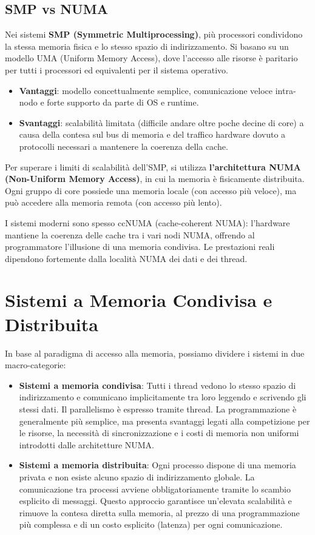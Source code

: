 \subsection{SMP vs NUMA}
Nei sistemi \textbf{SMP (Symmetric Multiprocessing)}, più processori condividono la stessa memoria fisica e lo stesso spazio di indirizzamento.
Si basano su un modello UMA (Uniform Memory Access), dove l'accesso alle risorse è paritario per tutti i processori ed equivalenti per il sistema operativo.
\begin{itemize}
    \item \textbf{Vantaggi}: modello concettualmente semplice, comunicazione veloce intra-nodo e forte supporto da parte di OS e runtime.
    \item \textbf{Svantaggi}: scalabilità limitata (difficile andare oltre poche decine di core) a causa della contesa sul bus di memoria e del traffico hardware dovuto a protocolli necessari a mantenere la coerenza della cache.
\end{itemize}
Per superare i limiti di scalabilità dell'SMP, si utilizza \textbf{l'architettura NUMA (Non-Uniform Memory Access)}, in cui la memoria è fisicamente distribuita.
Ogni gruppo di core possiede una memoria locale (con accesso più veloce), ma può accedere alla memoria remota (con accesso più lento).

I sistemi moderni sono spesso ccNUMA (cache-coherent NUMA): l'hardware mantiene la coerenza delle cache tra i vari nodi NUMA, offrendo al programmatore l'illusione di una memoria condivisa. Le prestazioni reali dipendono fortemente dalla località NUMA dei dati e dei thread.
\section{Sistemi a Memoria Condivisa e Distribuita}
In base al paradigma di accesso alla memoria, possiamo dividere i sistemi in due macro-categorie:
\begin{itemize}
    \item \textbf{Sistemi a memoria condivisa}: Tutti i thread vedono lo stesso spazio di indirizzamento e comunicano implicitamente tra loro leggendo e scrivendo gli stessi dati. Il parallelismo è espresso tramite thread. La programmazione è generalmente più semplice, ma presenta svantaggi legati alla competizione per le risorse, la necessità di sincronizzazione e i costi di memoria non uniformi introdotti dalle architetture NUMA.
    \item \textbf{Sistemi a memoria distribuita}: Ogni processo dispone di una memoria privata e non esiste alcuno spazio di indirizzamento globale. La comunicazione tra processi avviene obbligatoriamente tramite lo scambio esplicito di messaggi. Questo approccio garantisce un'elevata scalabilità e rimuove la contesa diretta sulla memoria, al prezzo di una programmazione più complessa e di un costo esplicito (latenza) per ogni comunicazione.
\end{itemize}

